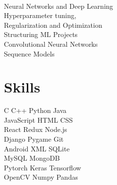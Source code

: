 \documentclass[]{deedy-resume-openfont}
\begin{document}
\begin{minipage}[t]{0.33\textwidth}
\vspace{5pt}
\vspace{1pt}
 \\
\vspace{1pt}
\hspace{3pt} Neural Networks and Deep Learning \\
\hspace{3pt} Hyperparameter tuning, \\ 
\hspace{3pt} Regularization and Optimization \\
\hspace{3pt} Structuring ML Projects \\
\hspace{3pt} Convolutional Neural Networks \\
\hspace{3pt} Sequence Models \\

\sectionsep


\section{Skills}
\vspace{2pt}
\vspace{2pt}
\textbullet{} C  
\textbullet{} C++  
\textbullet{} Python  
\textbullet{} Java
\\ 
\textbullet{} JavaScript  
\textbullet{} HTML 
\textbullet{} CSS 
\\ 
\vspace{2pt}
\vspace{2pt}
\textbullet{} React  
\textbullet{} Redux
\textbullet{} Node.js
\\
\textbullet{} Django 
\textbullet{} Pygame
\textbullet{} Git
\\
\textbullet{} Android 
\textbullet{} XML 
\textbullet{} SQLite
\\
\textbullet{} MySQL 
\textbullet{} MongoDB  \\
\vspace{2pt}
\vspace{2pt}
\textbullet{} Pytorch \textbullet{} Keras  \textbullet{} Tensorflow \\ 
\textbullet{} OpenCV \textbullet{} Numpy \textbullet{} 
Pandas \\ 
\sectionsep


%
%

\end{minipage} 
\end{document}

